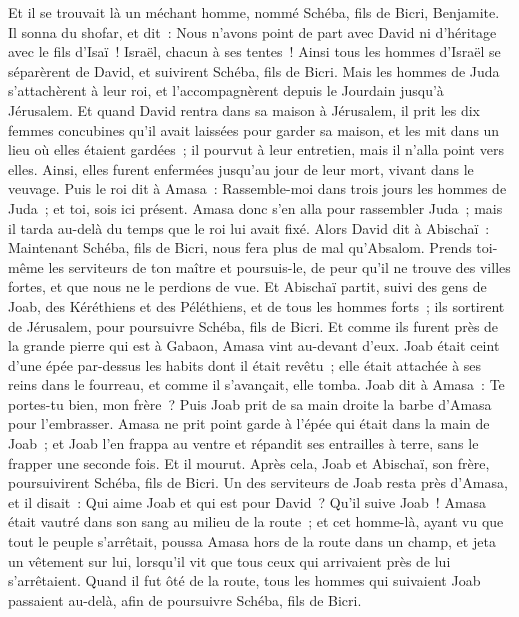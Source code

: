 \begin{multicols}{2}
\VerseOne{}Et il se trouvait là un méchant homme, nommé Schéba, fils de Bicri, Benjamite. Il sonna du shofar, et dit~: Nous n'avons point de part avec David ni d'héritage avec le fils d'Isaï~! Israël, chacun à ses tentes~!
Ainsi tous les hommes d'Israël se séparèrent de David, et suivirent Schéba, fils de Bicri. Mais les hommes de Juda s'attachèrent à leur roi, et l'accompagnèrent depuis le Jourdain jusqu'à Jérusalem.
Et quand David rentra dans sa maison à Jérusalem, il prit les dix femmes concubines qu'il avait laissées pour garder sa maison, et les mit dans un lieu où elles étaient gardées~; il pourvut à leur entretien, mais il n'alla point vers elles. Ainsi, elles furent enfermées jusqu'au jour de leur mort, vivant dans le veuvage.
Puis le roi dit à Amasa~: Rassemble-moi dans trois jours les hommes de Juda~; et toi, sois ici présent.
Amasa donc s'en alla pour rassembler Juda~; mais il tarda au-delà du temps que le roi lui avait fixé.
Alors David dit à Abischaï~: Maintenant Schéba, fils de Bicri, nous fera plus de mal qu'Absalom. Prends toi-même les serviteurs de ton maître et poursuis-le, de peur qu'il ne trouve des villes fortes, et que nous ne le perdions de vue.
Et Abischaï partit, suivi des gens de Joab, des Kéréthiens et des Péléthiens, et de tous les hommes forts~; ils sortirent de Jérusalem, pour poursuivre Schéba, fils de Bicri.
Et comme ils furent près de la grande pierre qui est à Gabaon, Amasa vint au-devant d'eux. Joab était ceint d'une épée par-dessus les habits dont il était revêtu~; elle était attachée à ses reins dans le fourreau, et comme il s'avançait, elle tomba.
Joab dit à Amasa~: Te portes-tu bien, mon frère~? Puis Joab prit de sa main droite la barbe d'Amasa pour l'embrasser.
Amasa ne prit point garde à l'épée qui était dans la main de Joab~; et Joab l'en frappa au ventre et répandit ses entrailles à terre, sans le frapper une seconde fois. Et il mourut. Après cela, Joab et Abischaï, son frère, poursuivirent Schéba, fils de Bicri.
Un des serviteurs de Joab resta près d'Amasa, et il disait~: Qui aime Joab et qui est pour David~? Qu'il suive Joab~!
Amasa était vautré dans son sang au milieu de la route~; et cet homme-là, ayant vu que tout le peuple s'arrêtait, poussa Amasa hors de la route dans un champ, et jeta un vêtement sur lui, lorsqu'il vit que tous ceux qui arrivaient près de lui s'arrêtaient.
Quand il fut ôté de la route, tous les hommes qui suivaient Joab passaient au-delà, afin de poursuivre Schéba, fils de Bicri.

\end{multicols}
